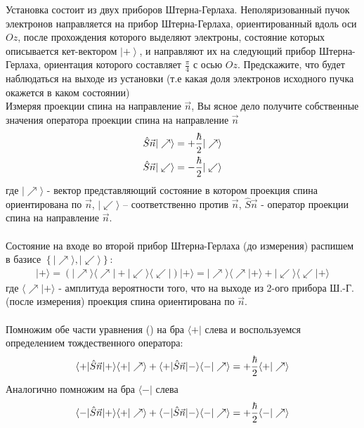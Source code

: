 \documentclass[__main__.tex]{subfiles}
\begin{document}
Установка состоит из двух приборов Штерна-Герлаха. Неполяризованный пучок электронов направляется на прибор Штерна-Герлаха, ориентированный вдоль оси $Oz$, после прохождения которого выделяют электроны, состояние которых описывается кет-вектором $\left|+\right>$, и направляют их на следующий прибор Штерна-Герлаха, ориентация которого составляет $\frac{\pi}{4}$ с осью $Oz$. Предскажите, что будет наблюдаться на выходе из установки (т.е какая доля электронов исходного пучка окажется в каком состоянии)\\

Измеряя проекции спина на направление $\vec{n}$, Вы ясное дело получите собственные значения оператора проекции спина на направление $\vec{n}$
\begin{gather}
    \llabel{ch-16-1}
    \hat{S}\vec{n}|\nearrow \rangle = +\frac{\hbar}{2}|\nearrow \rangle\\
    \hat{S}\vec{n}|\swarrow \rangle = -\frac{\hbar}{2}|\swarrow \rangle
\end{gather}
где $|\nearrow \rangle$ - вектор представляющий состояние в котором проекция спина ориентирована по $\vec{n}$, $|\swarrow \rangle$ -- соответственно против $\vec{n}$, $\hat{S}\vec{n}$ - оператор проекции спина на направление $\vec{n}$.\\\\
Состояние на входе во второй прибор Штерна-Герлаха (до измерения) распишем в базисе $\left\{|\nearrow\rangle , |\swarrow \rangle \right\}$:
\begin{gather*}
    |+\rangle = \left(|\nearrow\rangle\langle\nearrow|+|\swarrow\rangle\langle\swarrow|\right)|+\rangle = |\nearrow\rangle\langle\nearrow|+\rangle+|\swarrow\rangle\langle\swarrow|+\rangle
\end{gather*}
где $\langle\nearrow|+\rangle$ - амплитуда вероятности того, что на выходе из 2-ого прибора Ш.-Г.(после измерения) проекция спина ориентирована по $\vec{n}$.\\\\
Помножим обе части уравнения () на бра $\langle+|$ слева и воспользуемся определением тождественного оператора:
\begin{gather}
    \llabel{ch-16-2}
    \langle+|\hat{S}\vec{n}|+\rangle\langle+|\nearrow\rangle+\langle+|\hat{S}\vec{n}|-\rangle\langle-|\nearrow\rangle = +\frac{\hbar}{2}\langle+|\nearrow\rangle
\end{gather}
Аналогично помножим на бра $\langle-|$ слева
\begin{gather}
    \llabel{ch-16-3}
    \langle-|\hat{S}\vec{n}|+\rangle\langle+|\nearrow\rangle+\langle-|\hat{S}\vec{n}|-\rangle\langle-|\nearrow\rangle = +\frac{\hbar}{2}\langle-|\nearrow\rangle
\end{gather}
\end{document}
